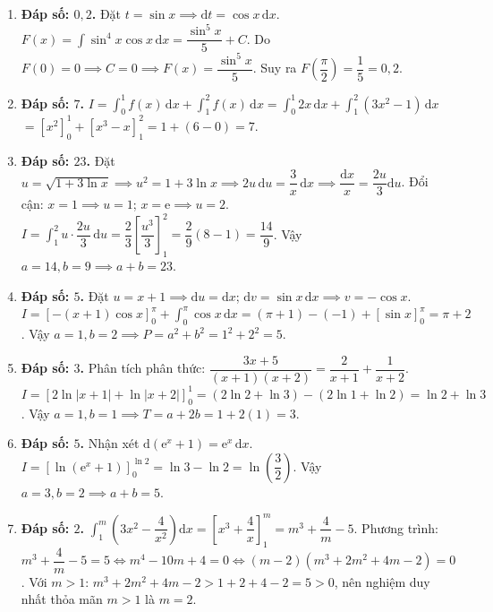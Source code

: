 \documentclass[12pt,a4paper]{article}
\begin{document}
\begin{enumerate}[start=16]
\item \textbf{Đáp số: $0{,}2$.}  
Đặt $t = \sin x \implies \mathrm{d}t = \cos x\,\mathrm{d}x$.  
$F(x) = \int \sin^4 x \cos x\,\mathrm{d}x = \dfrac{\sin^5 x}{5} + C$.  
Do $F(0) = 0 \implies C = 0 \implies F(x) = \dfrac{\sin^5 x}{5}$.  
Suy ra $F\!\left(\dfrac{\pi}{2}\right) = \dfrac{1}{5} = 0{,}2$.

\item \textbf{Đáp số: $7$.}  
$I = \int_0^1 f(x)\,\mathrm{d}x + \int_1^2 f(x)\,\mathrm{d}x = \int_0^1 2x\,\mathrm{d}x + \int_1^2 (3x^2 - 1)\,\mathrm{d}x$  
$= [x^2]_0^1 + [x^3 - x]_1^2 = 1 + (6 - 0) = 7$.

\item \textbf{Đáp số: $23$.}  
Đặt $u = \sqrt{1 + 3\ln x} \implies u^2 = 1 + 3\ln x \implies 2u\,\mathrm{d}u = \dfrac{3}{x}\,\mathrm{d}x \implies \dfrac{\mathrm{d}x}{x} = \dfrac{2u}{3}\mathrm{d}u$.  
Đổi cận: $x = 1 \implies u = 1$; $x = \mathrm{e} \implies u = 2$.  
$I = \int_1^2 u \cdot \dfrac{2u}{3}\,\mathrm{d}u = \dfrac{2}{3}\left[\dfrac{u^3}{3}\right]_1^2 = \dfrac{2}{9}(8 - 1) = \dfrac{14}{9}$.  
Vậy $a = 14, b = 9 \implies a + b = 23$.

\item \textbf{Đáp số: $5$.}  
Đặt $u = x + 1 \implies \mathrm{d}u = \mathrm{d}x$; $\mathrm{d}v = \sin x\,\mathrm{d}x \implies v = -\cos x$.  
$I = [-(x + 1)\cos x]_0^{\pi} + \int_0^{\pi} \cos x\,\mathrm{d}x = (\pi + 1) - (-1) + [\sin x]_0^{\pi} = \pi + 2$.  
Vậy $a = 1, b = 2 \implies P = a^2 + b^2 = 1^2 + 2^2 = 5$.

\item \textbf{Đáp số: $3$.}  
Phân tích phân thức: $\dfrac{3x + 5}{(x + 1)(x + 2)} = \dfrac{2}{x + 1} + \dfrac{1}{x + 2}$.  
$I = [2\ln|x+1| + \ln|x+2|]_0^1 = (2\ln 2 + \ln 3) - (2\ln 1 + \ln 2) = \ln 2 + \ln 3$.  
Vậy $a = 1, b = 1 \implies T = a + 2b = 1 + 2(1) = 3$.

\item \textbf{Đáp số: $5$.}  
Nhận xét $\mathrm{d}(\mathrm{e}^x + 1) = \mathrm{e}^x\,\mathrm{d}x$.  
$I = [\ln(\mathrm{e}^x + 1)]_0^{\ln 2} = \ln 3 - \ln 2 = \ln\!\left(\dfrac{3}{2}\right)$.  
Vậy $a = 3, b = 2 \implies a + b = 5$.

\item \textbf{Đáp số: $2$.}  
$\int_1^m \left(3x^2 - \dfrac{4}{x^2}\right)\mathrm{d}x = \left[x^3 + \dfrac{4}{x}\right]_1^m = m^3 + \dfrac{4}{m} - 5$.  
Phương trình: $m^3 + \dfrac{4}{m} - 5 = 5 \iff m^4 - 10m + 4 = 0 \iff (m - 2)(m^3 + 2m^2 + 4m - 2) = 0$.  
Với $m > 1$: $m^3 + 2m^2 + 4m - 2 > 1 + 2 + 4 - 2 = 5 > 0$, nên nghiệm duy nhất thỏa mãn $m > 1$ là $m = 2$.


\end{enumerate}
\end{document}
